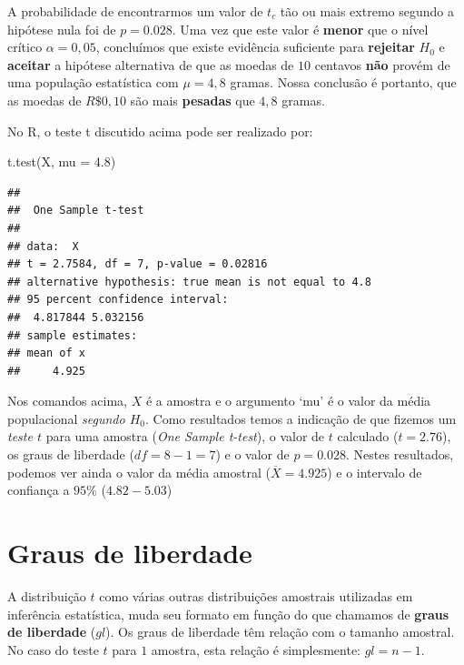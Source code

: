 \documentclass[
]{book}
\newenvironment{Shaded}{\begin{snugshade}}{\end{snugshade}}
\newcommand{\AttributeTok}[1]{\textcolor[rgb]{0.77,0.63,0.00}{#1}}
\newcommand{\FloatTok}[1]{\textcolor[rgb]{0.00,0.00,0.81}{#1}}
\newcommand{\FunctionTok}[1]{\textcolor[rgb]{0.00,0.00,0.00}{#1}}
\newcommand{\NormalTok}[1]{#1}
\begin{document}
A probabilidade de encontrarmos um valor de \(t_c\) tão ou mais extremo segundo a hipótese nula foi de \(p = 0.028\). Uma vez que este valor é \textbf{menor} que o nível crítico \(\alpha = 0,05\), concluímos que existe evidência suficiente para \textbf{rejeitar} \(H_0\) e \textbf{aceitar} a hipótese alternativa de que as moedas de \(10\) centavos \textbf{não} provém de uma população estatística com \(\mu = 4,8\) gramas. Nossa conclusão é portanto, que as moedas de \(R\$ 0,10\) são mais \textbf{pesadas} que \(4,8\) gramas.

No R, o teste t discutido acima pode ser realizado por:

\begin{Shaded}
\begin{Highlighting}[]
\FunctionTok{t.test}\NormalTok{(X, }\AttributeTok{mu =} \FloatTok{4.8}\NormalTok{)}
\end{Highlighting}
\end{Shaded}

\begin{verbatim}
## 
##  One Sample t-test
## 
## data:  X
## t = 2.7584, df = 7, p-value = 0.02816
## alternative hypothesis: true mean is not equal to 4.8
## 95 percent confidence interval:
##  4.817844 5.032156
## sample estimates:
## mean of x 
##     4.925
\end{verbatim}

Nos comandos acima, \(X\) é a amostra e o argumento `mu' é o valor da média populacional \emph{segundo \(H_0\)}. Como resultados temos a indicação de que fizemos um \emph{teste \(t\)} para uma amostra (\emph{One Sample t-test}), o valor de \(t\) calculado (\(t = 2.76\)), os graus de liberdade (\(df = 8 - 1 = 7\)) e o valor de \(p = 0.028\). Nestes resultados, podemos ver ainda o valor da média amostral (\(\overline{X} = 4.925\)) e o intervalo de confiança a \(95\%\) (\(4.82 - 5.03\))

\hypertarget{graus-de-liberdade}{%
\section{Graus de liberdade}\label{graus-de-liberdade}}

A distribuição \(t\) como várias outras distribuições amostrais utilizadas em inferência estatística, muda seu formato em função do que chamamos de \textbf{graus de liberdade} (\(gl\)). Os graus de liberdade têm relação com o tamanho amostral. No caso do teste \(t\) para \(1\) amostra, esta relação é simplesmente: \(gl = n-1\).
\end{document}
